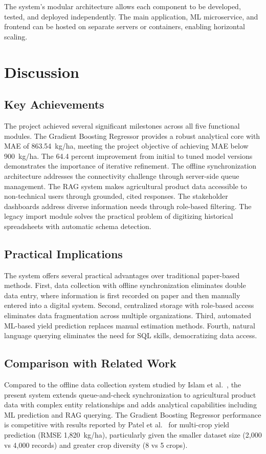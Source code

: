 \documentclass[12pt,a4paper,oneside]{report}
\begin{document}
The system's modular architecture allows each component to be developed, tested, and deployed independently. The main application, ML microservice, and frontend can be hosted on separate servers or containers, enabling horizontal scaling.

\section{Discussion}
\subsection{Key Achievements}
The project achieved several significant milestones across all five functional modules. The Gradient Boosting Regressor provides a robust analytical core with MAE of 863.54~kg/ha, meeting the project objective of achieving MAE below 900~kg/ha. The 64.4 percent improvement from initial to tuned model versions demonstrates the importance of iterative refinement. The offline synchronization architecture addresses the connectivity challenge through server-side queue management. The RAG system makes agricultural product data accessible to non-technical users through grounded, cited responses. The stakeholder dashboards address diverse information needs through role-based filtering. The legacy import module solves the practical problem of digitizing historical spreadsheets with automatic schema detection.

\subsection{Practical Implications}
The system offers several practical advantages over traditional paper-based methods. First, data collection with offline synchronization eliminates double data entry, where information is first recorded on paper and then manually entered into a digital system. Second, centralized storage with role-based access eliminates data fragmentation across multiple organizations. Third, automated ML-based yield prediction replaces manual estimation methods. Fourth, natural language querying eliminates the need for SQL skills, democratizing data access.

\subsection{Comparison with Related Work}
Compared to the offline data collection system studied by Islam et al.\ \cite{islam2021}, the present system extends queue-and-check synchronization to agricultural product data with complex entity relationships and adds analytical capabilities including ML prediction and RAG querying. The Gradient Boosting Regressor performance is competitive with results reported by Patel et al.\ \cite{patel2020} for multi-crop yield prediction (RMSE 1,820~kg/ha), particularly given the smaller dataset size (2,000 vs 4,000 records) and greater crop diversity (8 vs 5 crops).
\end{document}
